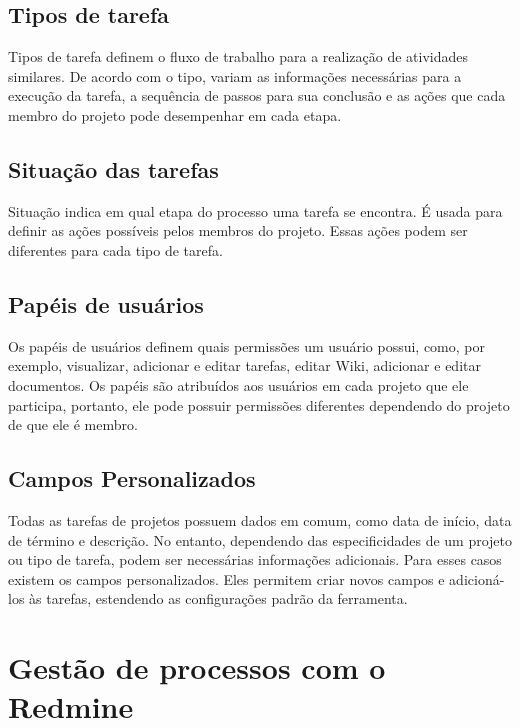 \subsection{Tipos de tarefa}\label{subsection:redmine-estrutura_basica-tracker}

Tipos de tarefa definem o fluxo de trabalho para a realização de atividades similares. De acordo com o tipo, variam as informações necessárias para a execução da tarefa, a sequência de passos para sua conclusão e as ações que cada membro do projeto pode desempenhar em cada etapa.

\subsection{Situação das tarefas}\label{subsection:redmine-estrutura_basica-status}

Situação indica em qual etapa do processo uma tarefa se encontra. É usada para definir as ações possíveis pelos membros do projeto. Essas ações podem ser diferentes para cada tipo de tarefa.

\subsection{Papéis de usuários}\label{subsection:redmine-estrutura_basica-role}

Os papéis de usuários definem quais permissões um usuário possui, como, por exemplo, visualizar, adicionar e editar tarefas, editar Wiki, adicionar e editar documentos. Os papéis são atribuídos aos usuários em cada projeto que ele participa, portanto, ele pode possuir permissões diferentes dependendo do projeto de que ele é membro.

\subsection{Campos Personalizados}\label{subsection:redmine-estrutura_basica-custom_fields}

Todas as tarefas de projetos possuem dados em comum, como data de início, data de término e descrição. No entanto, dependendo das especificidades de um projeto ou tipo de tarefa, podem ser necessárias informações adicionais. Para esses casos existem os campos personalizados. Eles permitem criar novos campos e adicioná-los às tarefas, estendendo as configurações padrão da ferramenta.

\section{Gestão de processos com o Redmine}\label{sec:redmine-gestao_processos}

